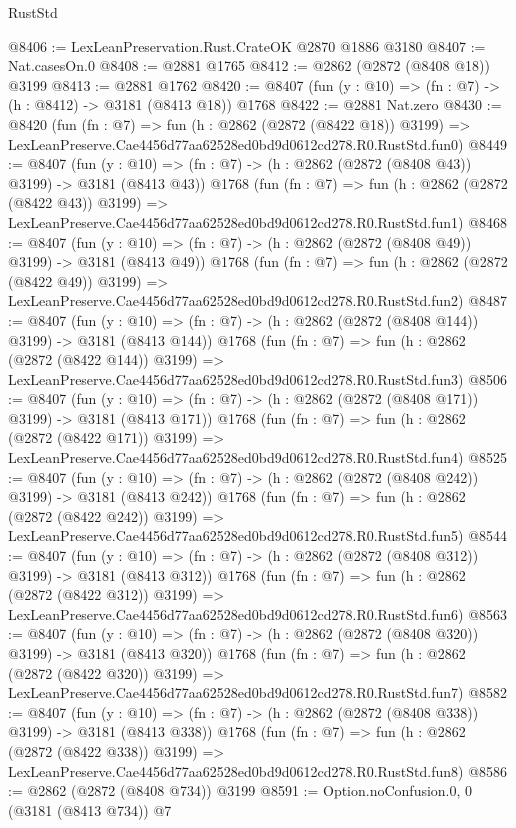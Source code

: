 \begin{lexlean}{RustStd}
\begin{coremodule}
@8406 := LexLeanPreservation.Rust.CrateOK @2870 @1886 @3180
@8407 := Nat.casesOn.{0}
@8408 := @2881 @1765
@8412 := @2862 (@2872 (@8408 @18)) @3199
@8413 := @2881 @1762
@8420 := @8407 (fun (y : @10) => (fn : @7) -> (h : @8412) -> @3181 (@8413 @18)) @1768
@8422 := @2881 Nat.zero
@8430 := @8420
    (fun (fn : @7) =>
    fun (h : @2862 (@2872 (@8422 @18)) @3199) =>
    LexLeanPreserve.Cae4456d77aa62528ed0bd9d0612cd278.R0.RustStd.fun0)
@8449 := @8407
    (fun (y : @10) => (fn : @7) -> (h : @2862 (@2872 (@8408 @43)) @3199) -> @3181 (@8413 @43))
    @1768
    (fun (fn : @7) =>
    fun (h : @2862 (@2872 (@8422 @43)) @3199) =>
    LexLeanPreserve.Cae4456d77aa62528ed0bd9d0612cd278.R0.RustStd.fun1)
@8468 := @8407
    (fun (y : @10) => (fn : @7) -> (h : @2862 (@2872 (@8408 @49)) @3199) -> @3181 (@8413 @49))
    @1768
    (fun (fn : @7) =>
    fun (h : @2862 (@2872 (@8422 @49)) @3199) =>
    LexLeanPreserve.Cae4456d77aa62528ed0bd9d0612cd278.R0.RustStd.fun2)
@8487 := @8407
    (fun (y : @10) => (fn : @7) -> (h : @2862 (@2872 (@8408 @144)) @3199) -> @3181 (@8413 @144))
    @1768
    (fun (fn : @7) =>
    fun (h : @2862 (@2872 (@8422 @144)) @3199) =>
    LexLeanPreserve.Cae4456d77aa62528ed0bd9d0612cd278.R0.RustStd.fun3)
@8506 := @8407
    (fun (y : @10) => (fn : @7) -> (h : @2862 (@2872 (@8408 @171)) @3199) -> @3181 (@8413 @171))
    @1768
    (fun (fn : @7) =>
    fun (h : @2862 (@2872 (@8422 @171)) @3199) =>
    LexLeanPreserve.Cae4456d77aa62528ed0bd9d0612cd278.R0.RustStd.fun4)
@8525 := @8407
    (fun (y : @10) => (fn : @7) -> (h : @2862 (@2872 (@8408 @242)) @3199) -> @3181 (@8413 @242))
    @1768
    (fun (fn : @7) =>
    fun (h : @2862 (@2872 (@8422 @242)) @3199) =>
    LexLeanPreserve.Cae4456d77aa62528ed0bd9d0612cd278.R0.RustStd.fun5)
@8544 := @8407
    (fun (y : @10) => (fn : @7) -> (h : @2862 (@2872 (@8408 @312)) @3199) -> @3181 (@8413 @312))
    @1768
    (fun (fn : @7) =>
    fun (h : @2862 (@2872 (@8422 @312)) @3199) =>
    LexLeanPreserve.Cae4456d77aa62528ed0bd9d0612cd278.R0.RustStd.fun6)
@8563 := @8407
    (fun (y : @10) => (fn : @7) -> (h : @2862 (@2872 (@8408 @320)) @3199) -> @3181 (@8413 @320))
    @1768
    (fun (fn : @7) =>
    fun (h : @2862 (@2872 (@8422 @320)) @3199) =>
    LexLeanPreserve.Cae4456d77aa62528ed0bd9d0612cd278.R0.RustStd.fun7)
@8582 := @8407
    (fun (y : @10) => (fn : @7) -> (h : @2862 (@2872 (@8408 @338)) @3199) -> @3181 (@8413 @338))
    @1768
    (fun (fn : @7) =>
    fun (h : @2862 (@2872 (@8422 @338)) @3199) =>
    LexLeanPreserve.Cae4456d77aa62528ed0bd9d0612cd278.R0.RustStd.fun8)
@8586 := @2862 (@2872 (@8408 @734)) @3199
@8591 := Option.noConfusion.{0, 0} (@3181 (@8413 @734)) @7

\end{coremodule}
\end{lexlean}
